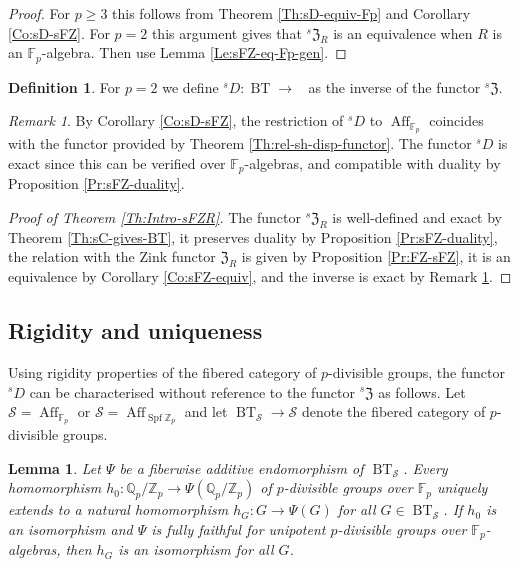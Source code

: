 \documentclass[a4paper,11pt]{amsart}
\theoremstyle{plain}
\newtheorem{Lemma}[equation]{Lemma}
\theoremstyle{definition}
\newtheorem{Defn}[equation]{Definition}
\theoremstyle{remark}
\newtheorem{Remark}[equation]{Remark}
\newcommand{\bLe}{\begin{Lemma}}
\newcommand{\eLe}{\end{Lemma}}
\newcommand{\bDe}{\begin{Defn}}
\newcommand{\eDe}{\end{Defn}}
\newcommand{\bRe}{\begin{Remark}}
\newcommand{\eRe}{\end{Remark}}
\newcommand{\bproof}{\begin{proof}}
\newcommand{\eproof}{\end{proof}}
\numberwithin{equation}{section}
\newcommand{\SSS}{\mathcal{S}}
\newcommand{\FZ}{\mathfrak{Z}}
\newcommand{\FF}{{\mathbb{F}}}
\newcommand{\QQ}{{\mathbb{Q}}}
\newcommand{\ZZ}{{\mathbb{Z}}}
\DeclareMathOperator{\Aff}{Aff}
\DeclareMathOperator{\BT}{BT}
\DeclareMathOperator{\sDisp}{{}^sDisp}
\DeclareMathOperator{\Spf}{Spf}
\newcommand{\sD}{{}^{s\!}D}
\newcommand{\sFZ}{{}^s\FZ}
\begin{document}
\bproof
For $p\ge 3$ this follows from Theorem \ref{Th:sD-equiv-Fp} and Corollary \ref{Co:sD-sFZ}. For $p=2$ this argument gives that $\sFZ_R$ is an equivalence when $R$ is an $\FF_p$-algebra. Then use Lemma \ref{Le:sFZ-eq-Fp-gen}.
\eproof

\bDe
\label{De:sD-general-p=2}
For $p=2$ we define $\sD\colon\BT\to\sDisp$ as the inverse of the functor $\sFZ$.
\eDe

\bRe
\label{Re:sD-exact-duality}
By Corollary \ref{Co:sD-sFZ}, the restriction of $\sD$ to $\Aff_{\FF_p}$ coincides with the functor provided by Theorem \ref{Th:rel-sh-disp-functor}.
The functor $\sD$ is exact since this can be verified over $\FF_p$-algebras, and compatible with duality by Proposition \ref{Pr:sFZ-duality}. 
\eRe

\bproof[Proof of Theorem \ref{Th:Intro-sFZR}]
The functor $\sFZ_R$ is well-defined and exact by Theorem \ref{Th:sC-gives-BT}, it preserves duality by Proposition \ref{Pr:sFZ-duality}, the relation with the Zink functor $\FZ_R$ is given by Proposition \ref{Pr:FZ-sFZ}, it is an equivalence by Corollary \ref{Co:sFZ-equiv}, and the inverse is exact by Remark \ref{Re:sD-exact-duality}.
\eproof

\subsection{Rigidity and uniqueness}
\label{Se:Dieud-equiv:rigidity}

Using rigidity properties of the fibered category of $p$-divisible groups, the functor $\sD$ can be characterised without reference to the functor $\sFZ$ as follows.
Let $\SSS=\Aff_{\FF_p}\!$ or $\SSS=\Aff_{\Spf\ZZ_p}\!$ and let $\BT_{\SSS}\to\SSS$ denote the fibered category of $p$-divisible groups.

\bLe
\label{Le:End-BT-Fp-Zp}
Let $\Psi$ be a fiberwise additive endomorphism of\/ $\BT_{\SSS}$. Every homomorphism $h_0\colon\QQ_p/\ZZ_p\to\Psi(\QQ_p/\ZZ_p)$ of $p$-divisible groups over $\FF_p$ uniquely extends to a natural homomorphism $h_G\colon G\to\Psi(G)$ for all $G\in\BT_{\SSS}$. If $h_0$ is an isomorphism and $\Psi$ is fully faithful for unipotent $p$-divisible groups over $\FF_p$-algebras, then $h_G$ is an isomorphism for all $G$.
\eLe
\end{document}

